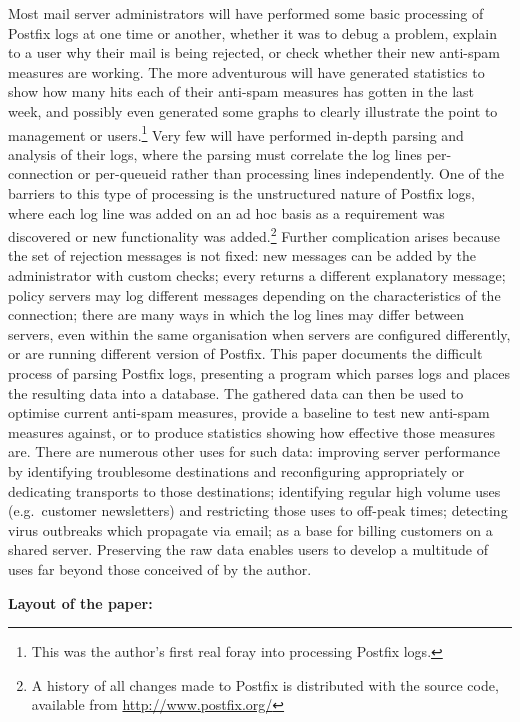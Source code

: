 \documentclass[a4paper,12pt,draft]{article}
\begin{document}
Most mail server administrators will have performed some basic processing
of Postfix logs at one time or another, whether it was to debug a problem,
explain to a user why their mail is being rejected, or check whether their
new anti-spam measures are working.  The more adventurous will have
generated statistics to show how many hits each of their anti-spam measures
has gotten in the last week, and possibly even generated some graphs to
clearly illustrate the point to management or users.\footnote{This was the
author's first real foray into processing Postfix logs.}  Very few will
have performed in-depth parsing and analysis of their logs, where the
parsing must correlate the log lines per-connection or per-queueid rather
than processing lines independently.  One of the barriers to this type of
processing is the unstructured nature of Postfix logs, where each log line
was added on an ad hoc basis as a requirement was discovered or new
functionality was added.\footnote{A history of all changes made to Postfix
is distributed with the source code, available from
\url{http://www.postfix.org/}} Further complication arises because the set
of rejection messages is not fixed: new messages can be added by the
administrator with custom checks; every \RBL{} returns a different
explanatory message; policy servers may log different messages depending on
the characteristics of the connection; there are many ways in which the log
lines may differ between servers, even within the same organisation when
servers are configured differently, or are running different version of
Postfix.  This paper documents the difficult process of parsing Postfix
logs, presenting a program which parses logs and places the resulting data
into a database.  The gathered data can then be used to optimise current
anti-spam measures, provide a baseline to test new anti-spam measures
against, or to produce statistics showing how effective those measures are.
There are numerous other uses for such data: improving server performance
by identifying troublesome destinations and reconfiguring appropriately or
dedicating transports to those destinations; identifying regular high
volume uses (e.g.\ customer newsletters) and restricting those uses to
off-peak times; detecting virus outbreaks which propagate via email; as a
base for billing customers on a shared server.  Preserving the raw data
enables users to develop a multitude of uses far beyond those conceived of
by the author.

\vspace{1em}\noindent\textbf{Layout of the paper:}
\end{document}
